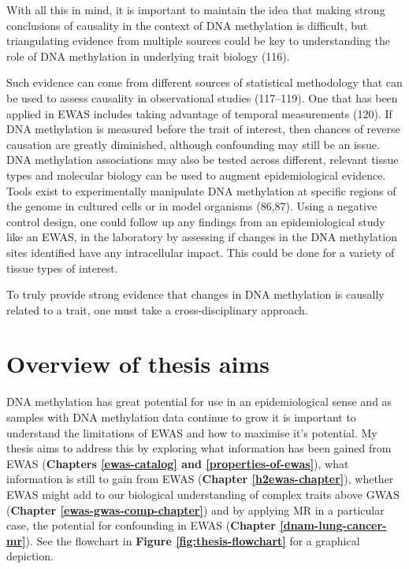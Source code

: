 \documentclass[11pt,oneside]{bristolthesis}
\begin{document}
With all this in mind, it is important to maintain the idea that making strong conclusions of causality in the context of DNA methylation is difficult, but triangulating evidence from multiple sources could be key to understanding the role of DNA methylation in underlying trait biology (116).

Such evidence can come from different sources of statistical methodology that can be used to assess causality in observational studies (117--119). One that has been applied in EWAS includes taking advantage of temporal measurements (120). If DNA methylation is measured before the trait of interest, then chances of reverse causation are greatly diminished, although confounding may still be an issue. DNA methylation associations may also be tested across different, relevant tissue types and molecular biology can be used to augment epidemiological evidence. Tools exist to experimentally manipulate DNA methylation at specific regions of the genome in cultured cells or in model organisms (86,87). Using a negative control design, one could follow up any findings from an epidemiological study like an EWAS, in the laboratory by assessing if changes in the DNA methylation sites identified have any intracellular impact. This could be done for a variety of tissue types of interest.

To truly provide strong evidence that changes in DNA methylation is causally related to a trait, one must take a cross-disciplinary approach.

\hypertarget{overview-of-thesis-aims}{%
\section{Overview of thesis aims}\label{overview-of-thesis-aims}}

DNA methylation has great potential for use in an epidemiological sense and as samples with DNA methylation data continue to grow it is important to understand the limitations of EWAS and how to maximise it's potential. My thesis aims to address this by exploring what information has been gained from EWAS (\textbf{Chapters \ref{ewas-catalog} and \ref{properties-of-ewas}}), what information is still to gain from EWAS (\textbf{Chapter \ref{h2ewas-chapter}}), whether EWAS might add to our biological understanding of complex traits above GWAS (\textbf{Chapter \ref{ewas-gwas-comp-chapter}}) and by applying MR in a particular case, the potential for confounding in EWAS (\textbf{Chapter \ref{dnam-lung-cancer-mr}}). See the flowchart in \textbf{Figure \ref{fig:thesis-flowchart}} for a graphical depiction.
\end{document}

